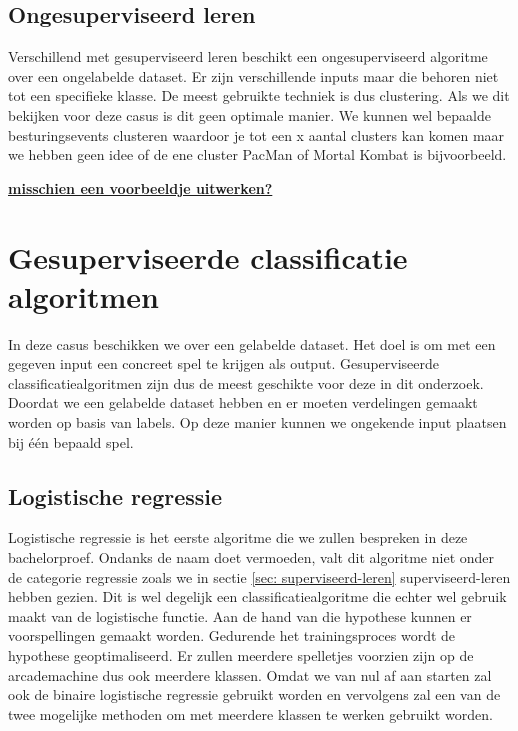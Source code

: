 \subsection*{Ongesuperviseerd leren}
\label{sec: ongesuperviseerd-leren}
Verschillend met gesuperviseerd leren beschikt een ongesuperviseerd algoritme over een ongelabelde dataset. Er zijn verschillende inputs maar die behoren niet tot een specifieke klasse. De meest gebruikte techniek is dus clustering. Als we dit bekijken voor deze casus is dit geen optimale manier. We kunnen wel bepaalde besturingsevents clusteren waardoor je tot een x aantal clusters kan komen maar we hebben geen idee of de ene cluster PacMan of Mortal Kombat is bijvoorbeeld. 


\textbf{\underline{{\Large misschien een voorbeeldje uitwerken? }}}


\section{Gesuperviseerde classificatie algoritmen}
\label{sec:gesuperviseerde-classificatie-algoritmen}

In deze casus beschikken we over een gelabelde dataset. Het doel is om met een gegeven input een concreet spel te krijgen als output. Gesuperviseerde classificatiealgoritmen zijn dus de meest geschikte voor deze in dit onderzoek. Doordat we een gelabelde dataset hebben en er moeten verdelingen gemaakt worden op basis van labels. Op deze manier kunnen we ongekende input plaatsen bij één bepaald spel.


\subsection{Logistische regressie}
\label{sec:logistische-regressie}

Logistische regressie is het eerste algoritme die we zullen bespreken in deze bachelorproef. Ondanks de naam doet vermoeden, valt dit algoritme niet onder de categorie regressie zoals we in sectie \ref{sec: superviseerd-leren} superviseerd-leren hebben gezien. Dit is wel degelijk een classificatiealgoritme die echter wel gebruik maakt van de logistische functie. Aan de hand van die hypothese kunnen er voorspellingen gemaakt worden. Gedurende het trainingsproces wordt de hypothese geoptimaliseerd. Er zullen meerdere spelletjes voorzien zijn op de arcademachine dus ook meerdere klassen. Omdat we van nul af aan starten zal ook de binaire logistische regressie gebruikt worden en vervolgens zal een van de twee mogelijke methoden om met meerdere klassen te werken gebruikt worden. 

